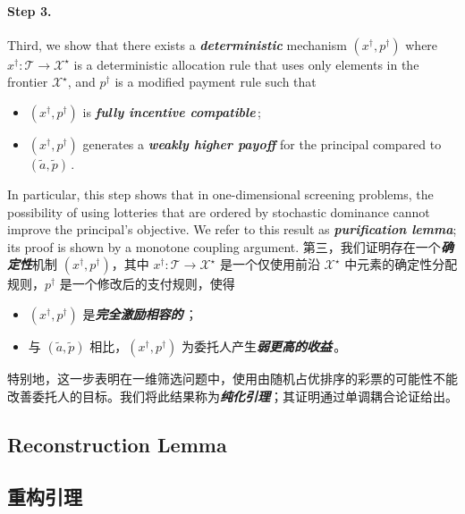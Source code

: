 \documentclass[12pt,letterpaper]{article}
\newenvironment{original}{\color{black}\noindent}{}
\newenvironment{translation}{\color{blue}\noindent}{}
\theoremstyle{plain}
\theoremstyle{definition}
\theoremstyle{remark}
\renewcommand{\1}{\mathds{1}}
\newcommand{\X}{\mathcal{X}}
\theoremstyle{definition}
\begin{document}
\paragraph{\textbf{Step 3.}}\hspace{-2mm}\begin{original}Third, we show that there exists a \textit{\textbf{deterministic}} mechanism $(x^\dagger, p^\dagger)$ where $x^\dagger:\mathcal{T} \rightarrow \X^\star$ is a deterministic allocation rule that uses only elements in the frontier $\mathcal{X}^\star$, and $p^\dagger$ is a modified payment rule such that
\begin{itemize}
    \item $(x^\dagger, p^\dagger)$ is \textit{\textbf{fully incentive compatible}}\,;
    \item $(x^\dagger, p^\dagger)$ generates a \textit{\textbf{weakly higher payoff}} for the principal compared to $(\tilde{a}, \tilde{p})$\,.
\end{itemize}
In particular, this step shows that in one-dimensional screening problems, the possibility of using lotteries that are ordered by stochastic dominance cannot improve the principal's objective. We refer to this result as \textit{\textbf{purification lemma}}; its proof is shown by a monotone coupling argument.
\end{original}
\begin{translation}
第三，我们证明存在一个\textit{\textbf{确定性}}机制 $(x^\dagger, p^\dagger)$，其中 $x^\dagger:\mathcal{T} \rightarrow \X^\star$ 是一个仅使用前沿 $\mathcal{X}^\star$ 中元素的确定性分配规则，$p^\dagger$ 是一个修改后的支付规则，使得
\begin{itemize}
    \item $(x^\dagger, p^\dagger)$ 是\textit{\textbf{完全激励相容的}}\,；
    \item 与 $(\tilde{a}, \tilde{p})$ 相比，$(x^\dagger, p^\dagger)$ 为委托人产生\textit{\textbf{弱更高的收益}}\,。
\end{itemize}
特别地，这一步表明在一维筛选问题中，使用由随机占优排序的彩票的可能性不能改善委托人的目标。我们将此结果称为\textit{\textbf{纯化引理}}；其证明通过单调耦合论证给出。
\end{translation}

\begin{original}
\subsection{Reconstruction Lemma}
\end{original}
\begin{translation}
\subsection{重构引理}
\end{translation}
\end{document}
